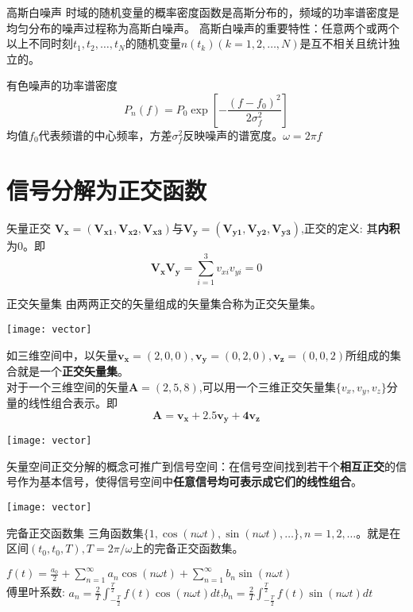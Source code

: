 \begin{frame}
\begin{block}{高斯白噪声}
	时域的随机变量的概率密度函数是高斯分布的，频域的功率谱密度是均匀分布的噪声过程称为高斯白噪声。
	高斯白噪声的重要特性：任意两个或两个以上不同时刻$t_1,t_2,\dots,t_N$的随机变量$n(t_k) (k=1,2,\dots,N)$是互不相关且统计独立的。
\end{block}
\begin{block}{有色噪声的功率谱密度}
	\[P_n(f) =P_0\exp[-\frac{(f-f_0)^2}{2\sigma_f^2}]\]
	均值$f_0$代表频谱的中心频率，方差$\sigma_f^2$反映噪声的谱宽度。$\omega=2\pi f$
\end{block}
\end{frame}

\section{信号分解为正交函数}

\begin{frame}
\begin{block}{矢量正交}
	$\bm{V_x=(V_{x1},V_{x2},V_{x3})}$与$\bm{V_y=(V_{y1},V_{y2},V_{y3})}$,正交的定义: 其\textbf{内积}为0。即
	\[\bm{V_xV_y}=\sum_{i=1}^{3}v_{xi}v_{yi}=0 \]
\end{block}
\begin{block}{正交矢量集}
	由两两正交的矢量组成的矢量集合称为正交矢量集。
\end{block}
\texttt{[image: vector]}
\end{frame}

\begin{frame}
\begin{example}
	如三维空间中，以矢量$\bm{v_x}=(2,0,0),\bm{v_y}=(0,2,0),\bm{v_z}=(0,0,2)$所组成的集合就是一个\textbf{正交矢量集}。\\
	对于一个三维空间的矢量$\bm{A}=(2,5,8)$,可以用一个三维正交矢量集$\{v_x,v_y,v_z\}$分量的线性组合表示。即
	\[\bm{A=v_x+2.5v_y+4v_z} \]
\end{example}
\texttt{[image: vector]}
\end{frame}

\begin{frame}
矢量空间正交分解的概念可推广到信号空间：在信号空间找到若干个\textbf{相互正交}的信号作为基本信号，使得信号空间中\textbf{任意信号均可表示成它们的线性组合}。 

\texttt{[image: vector]}
\end{frame}

\begin{frame}{完备正交函数集}
三角函数集$\{1,\cos(n\omega t),\sin(n\omega t),\dots\},n=1,2,\dots$。就是在区间$(t_0,t_0,T),T=2\pi/\omega$上的完备正交函数集。
\begin{example}[傅里叶级数的三角形式]
	$f(t)=\frac{a_0}{2}+\sum\limits_{n=1}^{\infty}a_n\cos(n\omega t)+\sum\limits_{n=1}^{\infty}b_n\sin(n\omega t)$\\
	傅里叶系数: $a_n=\frac{2}{T}\int_{-\frac{T}{2}}^{\frac{T}{2}}f(t)\cos(n\omega t)dt$,\quad $b_n=\frac{2}{T}\int_{-\frac{T}{2}}^{\frac{T}{2}}f(t)\sin(n\omega t)dt$
\end{example}
\end{frame}

